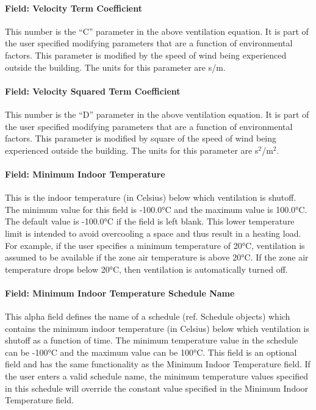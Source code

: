 \paragraph{Field: Velocity Term Coefficient}\label{field-velocity-term-coefficient-1}

This number is the ``C'' parameter in the above ventilation equation. It is part of the user specified modifying parameters that are a function of environmental factors. This parameter is modified by the speed of wind being experienced outside the building. The units for this parameter are s/m.

\paragraph{Field: Velocity Squared Term Coefficient}\label{field-velocity-squared-term-coefficient-1}

This number is the ``D'' parameter in the above ventilation equation. It is part of the user specified modifying parameters that are a function of environmental factors. This parameter is modified by square of the speed of wind being experienced outside the building. The units for this parameter are s\(^{2}\)/m\(^{2}\).

\paragraph{Field: Minimum Indoor Temperature}\label{field-minimum-indoor-temperature}

This is the indoor temperature (in Celsius) below which ventilation is shutoff. The minimum value for this field is -100.0°C and the maximum value is 100.0°C. The default value is -100.0°C if the field is left blank. This lower temperature limit is intended to avoid overcooling a space and thus result in a heating load. For example, if the user specifies a minimum temperature of 20°C, ventilation is assumed to be available if the zone air temperature is above 20°C. If the zone air temperature drops below 20°C, then ventilation is automatically turned off.

\paragraph{Field: Minimum Indoor Temperature Schedule Name}\label{field-minimum-indoor-temperature-schedule-name}

This alpha field defines the name of a schedule (ref. Schedule objects) which contains the minimum indoor temperature (in Celsius) below which ventilation is shutoff as a function of time. The minimum temperature value in the schedule can be -100°C and the maximum value can be 100°C. This field is an optional field and has the same functionality as the Minimum Indoor Temperature field. If the user enters a valid schedule name, the minimum temperature values specified in this schedule will override the constant value specified in the Minimum Indoor Temperature field.

